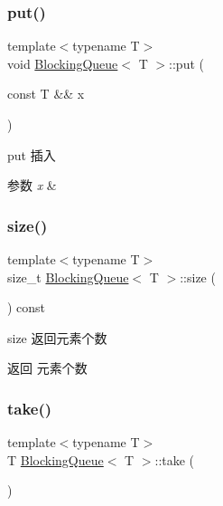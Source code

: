 \subsubsection{\texorpdfstring{put()}{put()}\hspace{0.1cm}{\footnotesize\ttfamily [2/2]}}
{\footnotesize\ttfamily template$<$typename T$>$ \\
void \hyperlink{classBlockingQueue}{Blocking\+Queue}$<$ T $>$\+::put (\begin{DoxyParamCaption}\item[{const T \&\&}]{x }\end{DoxyParamCaption})\hspace{0.3cm}{\ttfamily [inline]}}



put 插入 


\begin{DoxyParams}{参数}
{\em x} & \\
\hline
\end{DoxyParams}
\mbox{\label{classBlockingQueue_a733361d5721c6ba64af3e129921c43b0}} 
\subsubsection{\texorpdfstring{size()}{size()}}
{\footnotesize\ttfamily template$<$typename T$>$ \\
size\+\_\+t \hyperlink{classBlockingQueue}{Blocking\+Queue}$<$ T $>$\+::size (\begin{DoxyParamCaption}{ }\end{DoxyParamCaption}) const\hspace{0.3cm}{\ttfamily [inline]}}



size 返回元素个数 

\begin{DoxyReturn}{返回}
元素个数 
\end{DoxyReturn}
\mbox{\label{classBlockingQueue_aac788baea510940fc40961a285bacc5f}} 
\subsubsection{\texorpdfstring{take()}{take()}}
{\footnotesize\ttfamily template$<$typename T$>$ \\
T \hyperlink{classBlockingQueue}{Blocking\+Queue}$<$ T $>$\+::take (\begin{DoxyParamCaption}{ }\end{DoxyParamCaption})\hspace{0.3cm}{\ttfamily [inline]}}



